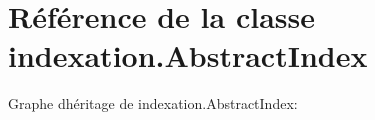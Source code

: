\hypertarget{classindexation_1_1AbstractIndex}{}\section{Référence de la classe indexation.\+Abstract\+Index}
\label{classindexation_1_1AbstractIndex}


Graphe d\textquotesingle{}héritage de indexation.\+Abstract\+Index\+:
